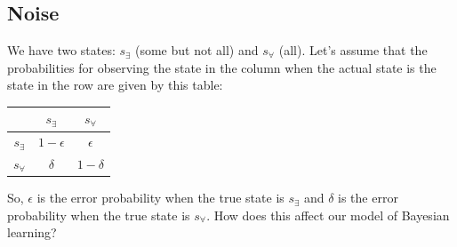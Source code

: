 \documentclass[a4paper]{article}
\begin{document}
\subsection{Noise}\label{subsec:noise}
We have two states: $s_\exists$ (some but not all) and $s_\forall$ (all). Let's assume that the
probabilities for observing the state in the column when the actual state is the state in the
row are given by this table:
\begin{center}
  \begin{tabular}{ccc}
    & $s_\exists$ & $s_\forall$ \\ \midrule 
    $s_\exists$ & $1-\epsilon$ & $\epsilon$ \\
    $s_\forall$ & $\delta$ & $1-\delta$
  \end{tabular}
\end{center}
So, $\epsilon$ is the error probability when the true state is $s_\exists$ and $\delta$ is the
error probability when the true state is $s_\forall$. How does this affect our model of
Bayesian learning?
\end{document}
